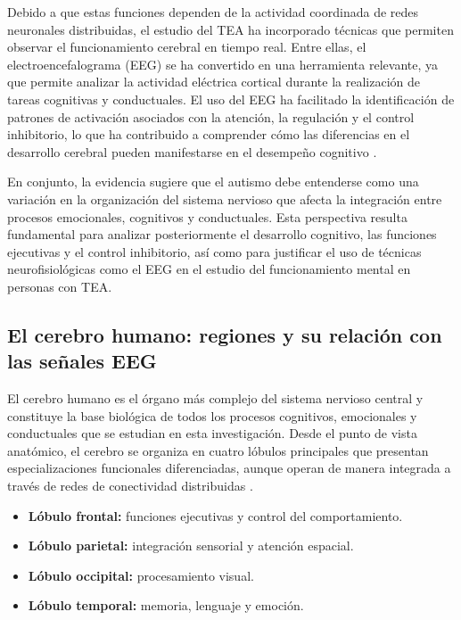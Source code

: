 \documentclass{book}
\begin{document}
Debido a que estas funciones dependen de la actividad coordinada de redes neuronales distribuidas, el estudio del TEA ha incorporado técnicas que permiten observar el funcionamiento cerebral en tiempo real. Entre ellas, el electroencefalograma (EEG) se ha convertido en una herramienta relevante, ya que permite analizar la actividad eléctrica cortical durante la realización de tareas cognitivas y conductuales. El uso del EEG ha facilitado la identificación de patrones de activación asociados con la atención, la regulación y el control inhibitorio, lo que ha contribuido a comprender cómo las diferencias en el desarrollo cerebral pueden manifestarse en el desempeño cognitivo \cite{Uhlhaas2006, Luck2014}.

En conjunto, la evidencia sugiere que el autismo debe entenderse como una variación en la organización del sistema nervioso que afecta la integración entre procesos emocionales, cognitivos y conductuales. Esta perspectiva resulta fundamental para analizar posteriormente el desarrollo cognitivo, las funciones ejecutivas y el control inhibitorio, así como para justificar el uso de técnicas neurofisiológicas como el EEG en el estudio del funcionamiento mental en personas con TEA.

\subsection{El cerebro humano: regiones y su relación con las señales EEG}

El cerebro humano es el órgano más complejo del sistema nervioso central y constituye la base biológica de todos los procesos cognitivos, emocionales y conductuales que se estudian en esta investigación. Desde el punto de vista anatómico, el cerebro se organiza en cuatro lóbulos principales que presentan especializaciones funcionales diferenciadas, aunque operan de manera integrada a través de redes de conectividad distribuidas \cite{Kandel2000, Bear2016}.

\begin{itemize}
    \item \textbf{Lóbulo frontal:} funciones ejecutivas y control del comportamiento.
    \item \textbf{Lóbulo parietal:} integración sensorial y atención espacial.
    \item \textbf{Lóbulo occipital:} procesamiento visual.
    \item \textbf{Lóbulo temporal:} memoria, lenguaje y emoción.
\end{itemize}
\end{document}
